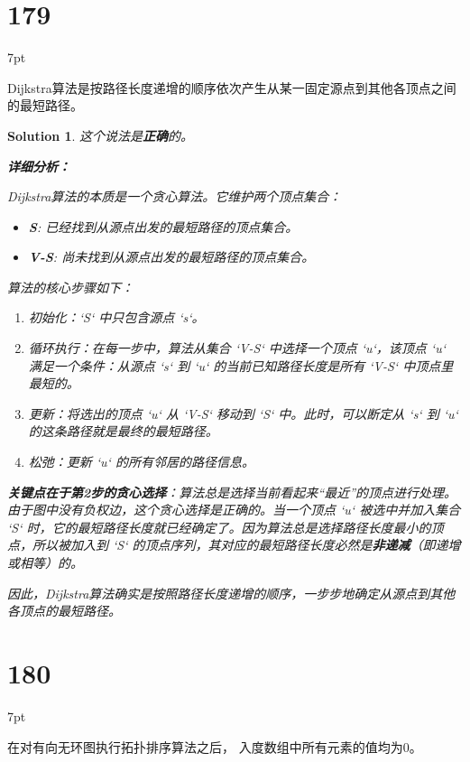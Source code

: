 \documentclass[UTF8]{report}
\newtheorem{solution}{Solution}
\theoremstyle{MyLineTheoremStyle} %
\theoremstyle{MyBlockTheoremStyle} %
\theoremstyle{MySubsubsectionStyle} %
\newenvironment{graybox}{%
        \def\FrameCommand{%
        \hspace{1pt}%
        {\color{gray}\small \vrule width 2pt}%
        {\color{graybox_color}\vrule width 4pt}%
        \colorbox{graybox_color}%
        }%
        \MakeFramed{\advance\hsize-\width\FrameRestore}%
        \noindent\hspace{-4.55pt}%
        \begin{adjustwidth}{}{7pt}%
        \vspace{2pt}\vspace{2pt}%
        }
        {%
        \vspace{2pt}\end{adjustwidth}\endMakeFramed%
        }
\begin{document}
\section*{179}
\begin{graybox}
Dijkstra算法是按路径长度递增的顺序依次产生从某一固定源点到其他各顶点之间的最短路径。
\end{graybox}

\begin{solution}
这个说法是\textbf{正确}的。

\textbf{详细分析：}

Dijkstra算法的本质是一个贪心算法。它维护两个顶点集合：
\begin{itemize}
    \item \textbf{S}: 已经找到从源点出发的最短路径的顶点集合。
    \item \textbf{V-S}: 尚未找到从源点出发的最短路径的顶点集合。
\end{itemize}

算法的核心步骤如下：
\begin{enumerate}
    \item 初始化：`S` 中只包含源点 `s`。
    \item 循环执行：在每一步中，算法从集合 `V-S` 中选择一个顶点 `u`，该顶点 `u` 满足一个条件：从源点 `s` 到 `u` 的当前已知路径长度是所有 `V-S` 中顶点里最短的。
    \item 更新：将选出的顶点 `u` 从 `V-S` 移动到 `S` 中。此时，可以断定从 `s` 到 `u` 的这条路径就是最终的最短路径。
    \item 松弛：更新 `u` 的所有邻居的路径信息。
\end{enumerate}

\textbf{关键点在于第2步的贪心选择}：算法总是选择当前看起来“最近”的顶点进行处理。由于图中没有负权边，这个贪心选择是正确的。当一个顶点 `u` 被选中并加入集合 `S` 时，它的最短路径长度就已经确定了。因为算法总是选择路径长度最小的顶点，所以被加入到 `S` 的顶点序列，其对应的最短路径长度必然是\textbf{非递减}（即递增或相等）的。

因此，Dijkstra算法确实是按照路径长度递增的顺序，一步步地确定从源点到其他各顶点的最短路径。
\end{solution}


\section*{180}
\begin{graybox}
在对有向无环图执行拓扑排序算法之后，
入度数组中所有元素的值均为0。
\end{graybox}
\end{document}
